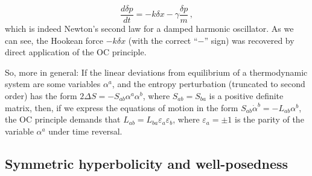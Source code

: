 \documentclass[a4paper, amsfonts, amssymb, amsmath, reprint, showkeys, nofootinbib, twoside, onecolumn,notitlepage]{revtex4-1}
\begin{document}
\begin{equation}\label{hook}
\dfrac{d \delta p}{dt}=-k \delta x -\gamma \dfrac{\delta p}{m} \, ,
\end{equation}
which is indeed Newton's second law for a damped harmonic oscillator. As we can see, the Hookean force $-k \delta x$ (with the correct ``$-$'' sign) was recovered by direct application of the OC principle. 


So, more in general: If the linear deviations from equilibrium of a thermodynamic system are some variables $\alpha^a$, and the entropy perturbation (truncated to second order) has the form $2\Delta S=-S_{ab}\alpha^a  \alpha^b$, where $S_{ab}=S_{ba}$ is a positive definite matrix, then, if we express the equations of motion in the form $S_{ab} \dot{\alpha}^b =-L_{ab} \alpha^b$, the OC principle demands that $L_{ab}=L_{ba} \varepsilon_a \varepsilon_b $, where $\varepsilon_a = \pm 1$ is the parity of the variable $\alpha^a$ under time reversal.


\subsection{Symmetric hyperbolicity and well-posedness}
\end{document}
